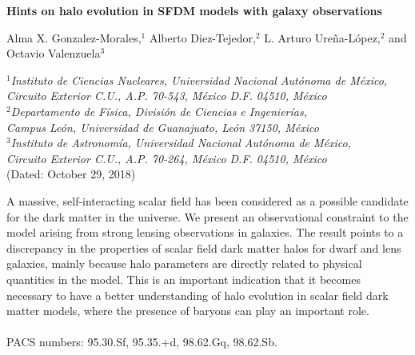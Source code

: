 \documentclass{article}
\begin{document}
\begin{center}
\textbf{\large{Hints on halo evolution in SFDM models with galaxy observations}}
\end{center}


\small

\small{Alma X. Gonzalez-Morales,$^1$ Alberto Diez-Tejedor,$^2$ L. Arturo Ureña-López,$^2$ and Octavio} Valenzuela$^3$\vspace{1mm}
\begin{center}
\textit{$^1$Instituto de Ciencias Nucleares, Universidad Nacional Autónoma de México,\\
Circuito Exterior C.U., A.P. 70-543, México D.F. 04510, México\\
$^2$Departamento de Física, División de Ciencias e Ingenierías,\\
Campus León, Universidad de Guanajuato, León 37150, México\\
$^3$Instituto de Astronomía, Universidad Nacional Autónoma de México,\\
Circuito Exterior C.U., A.P. 70-264, México D.F. 04510, México\\}
(Dated: October 29, 2018)
\end{center}
\vspace{5mm}
A massive, self-interacting scalar field has been considered as a possible candidate for the dark
matter in the universe. We present an observational constraint to the model arising from strong
lensing observations in galaxies. The result points to a discrepancy in the properties of scalar field
dark matter halos for dwarf and lens galaxies, mainly because halo parameters are directly related
to physical quantities in the model. This is an important indication that it becomes necessary to
have a better understanding of halo evolution in scalar field dark matter models, where the presence
of baryons can play an important role.\\\\
PACS numbers: 95.30.Sf, 95.35.+d, 98.62.Gq, 98.62.Sb.
\end{document}
